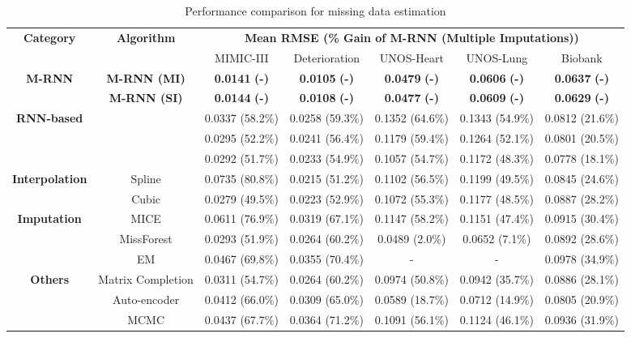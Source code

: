 \documentclass{article}
\begin{document}
    
     \begin{table*}[t!]
	\caption{Performance comparison for missing data estimation }
	\label{tab:Imputation}
	\centering
	\small
	\begin{tabular}{c|c|c|c|c|c|c}
		\toprule
		\multirow{2}{*}{\textbf{Category}}&\multirow{2}{*}{\textbf{Algorithm}}&\multicolumn{5}{c}{\textbf{Mean RMSE (\% Gain of M-RNN (Multiple Imputations))}}  \\
		\cmidrule{3-7}
		& & MIMIC-III & Deterioration & UNOS-Heart & UNOS-Lung & Biobank \\
		\midrule
		\multirow{2}{*}{\textbf{M-RNN}}&\textbf{M-RNN (MI)} &\textbf{0.0141}  \textbf{(-)} &  \textbf{0.0105}  \textbf{(-)} &\textbf{0.0479}  \textbf{(-)}&\textbf{0.0606}  \textbf{(-)} &\textbf{0.0637}  \textbf{(-)}\\
		& \textbf{M-RNN (SI)} &\textbf{0.0144}  \textbf{(-)}&  \textbf{0.0108}  \textbf{(-)}  &\textbf{0.0477}  \textbf{(-)}&\textbf{0.0609}  \textbf{(-)}&\textbf{0.0629}  \textbf{(-)} \\
		\midrule
		\multirow{3}{*}{\textbf{RNN-based}}&\cite{Recent_RNN1} &0.0337  (58.2\%)& 0.0258  (59.3\%) & 0.1352 (64.6\%)&   0.1343 (54.9\%) &   0.0812 (21.6\%) \\
		&\cite{Recent_RNN2} &0.0295   (52.2\%)& 0.0241   (56.4\%)& 0.1179 (59.4\%) & 0.1264 (52.1\%)&   0.0801 (20.5\%)\\
		&\cite{Recent_RNN3} &0.0292   (51.7\%)& 0.0233   (54.9\%)& 0.1057 (54.7\%) & 0.1172 (48.3\%)&   0.0778 (18.1\%) \\
		\midrule
		\multirow{2}{*}{\textbf{Interpolation}} &Spline &0.0735  (80.8\%)  &  0.0215  (51.2\%)& 0.1102  (56.5\%) & 0.1199 (49.5\%)&   0.0845 (24.6\%)\\
		&Cubic   &0.0279  (49.5\%)& 0.0223  (52.9\%)& 0.1072 (55.3\%) & 0.1177 (48.5\%)& 0.0887 (28.2\%)\\
		\midrule
		\multirow{3}{*}{\textbf{Imputation}}&MICE &0.0611 (76.9\%)&  0.0319 (67.1\%) &0.1147  (58.2\%)& 0.1151  (47.4\%)& 0.0915 (30.4\%)\\
		& MissForest & 0.0293 (51.9\%)& 0.0264 (60.2\%)  &0.0489  (2.0\%)& 0.0652  (7.1\%) & 0.0892 (28.6\%) \\
		& EM  &0.0467  (69.8\%)&  0.0355  (70.4\%)&- & -& 0.0978 (34.9\%) \\ \midrule
		\multirow{3}{*}{\textbf{Others}} &Matrix Completion  &0.0311  (54.7\%) &  0.0264  (60.2\%)&0.0974  (50.8\%)& 0.0942 (35.7\%) & 0.0886 (28.1\%) \\
		&Auto-encoder & 0.0412 (66.0\%) & 0.0309 (65.0\%)  & 0.0589 (18.7\%) & 0.0712 (14.9\%)& 0.0805 (20.9\%) \\	
		&MCMC  & 0.0437 (67.7\%) & 0.0364 (71.2\%)  & 0.1091 (56.1\%) & 0.1124 (46.1\%)& 0.0936 (31.9\%) \\			
		\bottomrule
	\end{tabular}
\end{table*}
\end{document}
